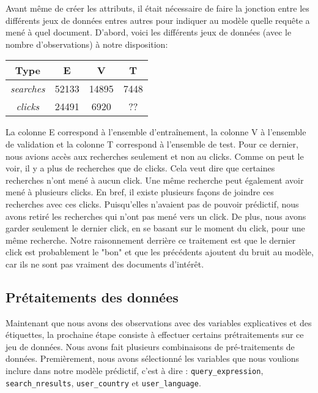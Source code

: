 
Avant même de créer les attributs, il était nécessaire de faire la jonction entre les différents jeux de données entres autres pour indiquer au modèle quelle requête a mené à quel document. 
D'abord, voici les différents jeux de données (avec le nombre d'observations) à notre disposition:

\begin{center}
  \begin{tabular}{ |c|c|c|c| } 
     \hline
     Type & E & V & T \\
     \hline
     \hline
     \textit{searches} & 52133 & 14895 & 7448 \\ 
     \hline
     \textit{clicks} & 24491 & 6920 & ?? \\ 
     \hline
  \end{tabular}
\end{center}

La colonne E correspond à l'ensemble d'entraînement, la colonne V à l'ensemble de validation et la colonne T correspond à l'ensemble de test. 
Pour ce dernier, nous avions accès aux recherches seulement et non au clicks. 
Comme on peut le voir, il y a plus de recherches que de clicks. 
Cela veut dire que certaines recherches n'ont mené à aucun click. 
Une même recherche peut également avoir mené à plusieurs clicks. 
En bref, il existe plusieurs façons de joindre ces recherches avec ces clicks. 
Puisqu'elles n'avaient pas de pouvoir prédictif, nous avons retiré les recherches qui n'ont pas mené vers un click. 
De plus, nous avons garder seulement le dernier click, en se basant sur le moment du click, pour une même recherche. 
Notre raisonnement derrière ce traitement est que le dernier click est probablement le "bon" et que les précédents ajoutent du bruit au modèle, car ils ne sont pas vraiment des documents d'intérêt.

\subsection{Prétaitements des données}

Maintenant que nous avons des observations avec des variables explicatives et des étiquettes, la prochaine étape consiste à effectuer certains prétraitements sur ce jeu de données. Nous avons fait plusieurs combinaisons de pré-traitements de données. Premièrement, nous avons sélectionné les variables que nous voulions inclure dans notre modèle prédictif, c'est à dire : \texttt{query\_expression}, \texttt{search\_nresults}, \texttt{user\_country} et \texttt{user\_language}.

